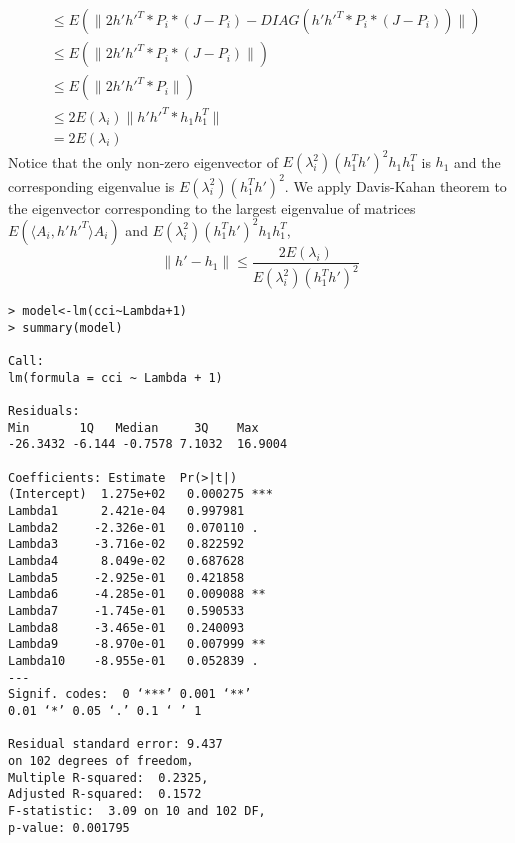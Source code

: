 \documentclass[10pt,journal,compsoc]{IEEEtran}
\newenvironment{proof}[1][Proof]{\begin{trivlist}
		\item[\hskip \labelsep {\bfseries #1}]}{\end{trivlist}}
\begin{document}
\begin{proof} [Proof of Theorem 4.2]
\begin{align*}
	&\leq  E(\|2 h' h'^T *P_i*(J-P_i) - DIAG(h' h'^T*P_i*(J-P_i))\|) \\
	&\leq  E(\|2 h' h'^T *P_i*(J-P_i)\|) \\
	&\leq  E(\|2 h' h'^T * P_i\|) \\
	&\leq  2 E(\lambda_i)\| h' h'^T * h_1 h_1^T\| \\
	&=  2 E(\lambda_i) 
	\end{align*}
	Notice that the only non-zero eigenvector of $E(\lambda_i^2) (h_1^Th')^2 h_1 h_1^T$ is $h_1$ and the corresponding eigenvalue is $E(\lambda_i^2) (h_1^Th')^2$. We apply Davis-Kahan theorem \cite{davis1970rotation} to the eigenvector corresponding to the largest eigenvalue of matrices $E(\langle A_{i},h' h'^T \rangle A_{i} )$ and $E(\lambda_i^2) (h_1^Th')^2 h_1 h_1^T$,
	\[\|h'-h_1\| \leq \frac{2 E(\lambda_i)}{E(\lambda_i^2)(h_1^T h')^2} \]
\end{proof}

\begin{lstlisting}
> model<-lm(cci~Lambda+1)
> summary(model)

Call:
lm(formula = cci ~ Lambda + 1)

Residuals:
Min       1Q   Median     3Q    Max 
-26.3432 -6.144 -0.7578 7.1032  16.9004 

Coefficients: Estimate  Pr(>|t|)    
(Intercept)  1.275e+02   0.000275 ***
Lambda1      2.421e-04   0.997981    
Lambda2     -2.326e-01   0.070110 .  
Lambda3     -3.716e-02   0.822592    
Lambda4      8.049e-02   0.687628    
Lambda5     -2.925e-01   0.421858    
Lambda6     -4.285e-01   0.009088 ** 
Lambda7     -1.745e-01   0.590533    
Lambda8     -3.465e-01   0.240093    
Lambda9     -8.970e-01   0.007999 ** 
Lambda10    -8.955e-01   0.052839 .  
---
Signif. codes:  0 ‘***’ 0.001 ‘**’ 
0.01 ‘*’ 0.05 ‘.’ 0.1 ‘ ’ 1

Residual standard error: 9.437 
on 102 degrees of freedom，
Multiple R-squared:  0.2325,
Adjusted R-squared:  0.1572 
F-statistic:  3.09 on 10 and 102 DF,  
p-value: 0.001795
\end{lstlisting}


%
%
%


\end{document}
